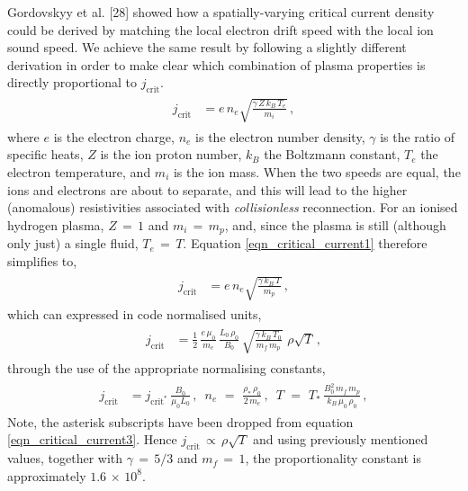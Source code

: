 \documentclass{./packages/rs/rsproca}
\begin{document}
Gordovskyy et al. [28] showed how a spatially-varying critical current density could be derived by matching the local electron drift speed with the local ion sound speed. We achieve the same result by following a slightly different derivation in order to make clear which combination of plasma properties is directly proportional to $j_{\mathrm{crit}}$.
\begin{align}\begin{split}  
\label{eqn_critical_current1}
j_{\mathrm{crit}} &= e\,n_e \sqrt{\frac{\gamma\,Z\,k_B\,T_e}{m_i}}\,,
\end{split}\end{align}
where $e$ is the electron charge, $n_e$ is the electron number density, $\gamma$ is the ratio of specific heats, $Z$ is the ion proton number, $k_B$ the Boltzmann constant, $T_e$ the electron temperature, and $m_i$ is the ion mass. When the two speeds are equal, the ions and electrons are about to separate, and this will lead to the higher (anomalous) resistivities associated with \textit{collisionless} reconnection. For an ionised hydrogen plasma, $Z\,{=}\,1$ and $m_i\,{=}\,m_p$, and, since the plasma is still (although only just) a single fluid, $T_e\,{=}\,T$. Equation \ref{eqn_critical_current1} therefore simplifies to,
\begin{align}\begin{split}  
\label{eqn_critical_current2}
j_{\mathrm{crit}} &= e\,n_e \sqrt{\frac{\gamma\,k_B\,T}{m_p}}\,,
\end{split}\end{align}
which can expressed in code normalised units,
\begin{align}\begin{split}  
\label{eqn_critical_current3}
j_{\mathrm{crit}} &= \frac{1}{2}\,\frac{e\,\mu_0}{m_e}\,\frac{L_0\,\rho_0}{B_0}\,\sqrt{\frac{\gamma\,k_B\,T_0}{m_f\,m_p}}\,\,\rho\sqrt{T}\,,
\end{split}\end{align}
through the use of the appropriate normalising constants,
\begin{align}\begin{split}  
\label{eqn_normalised_current}
j_{\mathrm{crit}} &= j_{\mathrm{crit^\ast}}\,\frac{B_0}{\mu_0 L_0}\,,\,\,\,n_{e} \,\,=\,\, \frac{\rho_{\ast}\,\rho_0}{2\,m_e}\,,\,\,\,T \,\,=\,\, T_{\ast}\,\frac{B_0^2\,m_f\,m_p}{k_B\,\mu_0\,\rho_0}\,,
\end{split}\end{align}
Note, the asterisk subscripts have been dropped from equation \ref{eqn_critical_current3}. Hence $j_{\mathrm{crit}}\,{\propto}\,\rho\sqrt{T}$ and using previously mentioned values, together with $\gamma\,{=}\,5/3$ and $m_f\,{=}\,1$, the proportionality constant is approximately $1.6\,{\times}\,10^8$.
\end{document}
